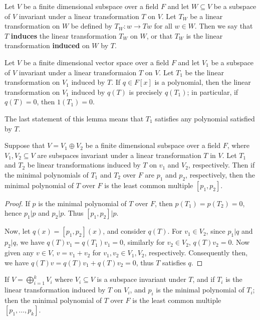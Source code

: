 \begin{definition}
    Let $V$ be a finite dimensional subspace over a field $F$ and let $W
    \subseteq V$ be a subspace of $V$ invariant under a linear transformation
    $T$ on  $V$. Let  $T_W$ be a linear transformation on $W$ be defined by
    $T_W:w \rightarrow Tw$ for all $w \in W$. Then we say that  $T$
    \textbf{induces} the linear transformation $T_W$ on  $W$, or that  $T_W$ is
    the linear transformation  \textbf{induced} on $W$ by  $T$.
\end{definition}

\begin{lemma}\label{3.4.15}
    Let $V$ be a finite dimensional vector space over a field  $F$ and let
    $V_1$ be a subspace of $V$ invariant under a linear transformaion $T$ on
    $V$. Let  $T_1$ be the linear transformation on $V_1$ induced by $T$. If
    $q \in F[x]$ is a polynomial, then the linear transformation on $V_1$
    induced by $q(T)$ is precisely $q(T_1)$; in particular, if $q(T)=0$, then
    $1(T_1)=0$.
\end{lemma}
\begin{remark}
    The last statement of this lemma means that $T_1$ satisfies any polynomial
    satisfied by $T$.
\end{remark}

\begin{lemma}\label{3.4.16}
    Suppose that $V=V_1 \oplus V_2$ be a finite dimensional subspace over a
    field $F$, where $V_1, V_2 \subseteq V$ are subspaces invariant under a
    linear transformation $T$ in  $V$. Let $T_1$ and $T_2$ be linear
    transformations induced by $T$ on  $v_1$ and $V_2$, respectively. Then if
    the minimal polynomials of $T_1$ and $T_2$ over $F$ are  $p_1$ and $p_2$,
    respectively, then the minimal polynomial of $T$ over  $F$ is the least
    common multiple  $[p_1,p_2]$.
\end{lemma}
\begin{proof}
    If $p$ is the minimal polynomial of  $T$ over  $F$, then
    $p(T_1)=p(T_2)=0$, hence $p_1|p$ and $p_2|p$. Thus $[p_1,p_2]|p$.

    Now, let $q(x)=[p_1,p_2](x)$, and consider $q(T)$. For $v_1 \in V_2$, since
    $p_1|q$ and $p_2|q$, we have $q(T)v_1=q(T_1)v_1=0$, similarly for $v_2 \in
    V_2$, $q(T)v_2=0$. Now given any $ v \in V$, $v=v_1+v_2$ for $v_1,v_2 \in
    V_1,V_2$, respectively. Consequently then, we have
    $q(T)v=q(T)v_1+q(T)v_2=0$, thus $T$ satisfies  $q$.
\end{proof}
\begin{corollary}
    If $V = \bigoplus_{i=1}^k{V_i}$ where  $V_i \subseteq V$ is a subspace
    invariant under $T$, and if $T_i$ is the linear transformation induced by
    $T$ on  $V_i$, and  $p_i$ is the minimal polynomial of  $T_i$; then the
    minimal polynomial of  $T$ over  $F$ is the least common multiple  $[p_1,
\dots, p_k]$.
\end{corollary}

